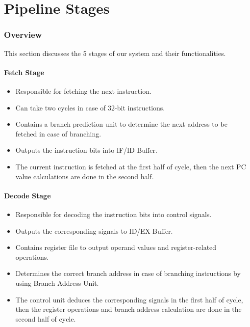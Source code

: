 \documentclass[12pt]{report}
\begin{document}
\begin{itemize}
\begin{center}
\begin{tabular}{||c| c| c| c| p{40mm}||}
        \end{tabular}
        \end{center}


\end{itemize}




\part{Pipeline Stages}

\section{Overview}
This section discusses the 5 stages of our system and their functionalities.

\subsection{Fetch Stage}
\begin{itemize}
    \item Responsible for fetching the next instruction.
    \item Can take two cycles in case of 32-bit instructions.
    \item Contains a branch prediction unit to determine the next address to be fetched in case of branching.
    \item Outputs the instruction bits into IF/ID Buffer.
    \item The current instruction is fetched at the first half of cycle, then the next PC value calculations are done in the second half.
\end{itemize}

\subsection{Decode Stage}
\begin{itemize}
    \item Responsible for decoding the instruction bits into control signals.
    \item Outputs the corresponding signals to ID/EX Buffer.
    \item Contains register file to output operand values and register-related operations.
    \item Determines the correct branch address in case of branching instructions by using Branch Address Unit.
    \item The control unit deduces the corresponding signals in the first half of cycle, then the register operations and branch address calculation are done in the second half of cycle.
\end{itemize}
\end{document}
